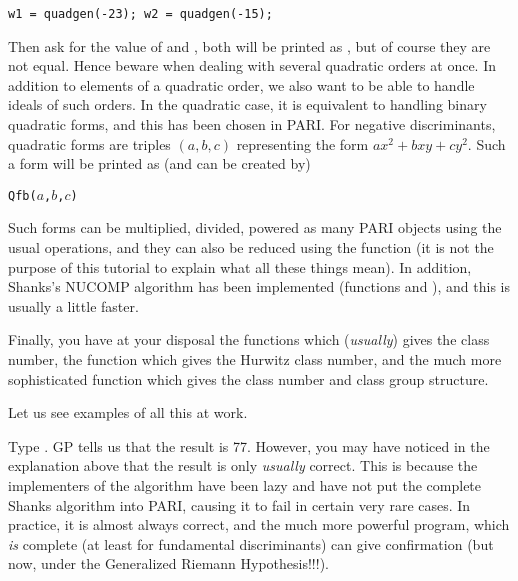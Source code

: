 \centerline{\tt w1 = quadgen(-23); w2 = quadgen(-15);}

Then ask for the value of  and , both will be printed as
, but of course they are not equal. Hence beware when dealing with
several quadratic orders at once. \smallskip
%
In addition to elements of a quadratic order, we also want to be able to
handle ideals of such orders. In the quadratic case, it is equivalent to
handling binary quadratic forms, and this has been chosen in PARI. For
negative discriminants, quadratic forms are triples $(a,b,c)$ representing
the form $ax^2+bxy+cy^2$. Such a form will be printed as (and can be created
by)

\centerline{\tt Qfb($a$,$b$,$c$)}

Such forms can be multiplied, divided, powered as many PARI objects using
the usual operations, and they can also be reduced using the function
 (it is not the purpose of this tutorial to explain what all
these things mean). In addition, Shanks's NUCOMP algorithm has been
implemented (functions  and ), and this is
usually a little faster.

Finally, you have at your disposal the functions  which
({\it usually\/}) gives the class number, the function 
which gives the Hurwitz class number, and the much more sophisticated
 function which gives the class number and class group
structure.

Let us see examples of all this at work.

Type . GP tells us that the result is 77. However,
you may have noticed in the explanation above that the result is only
{\it usually\/} correct. This is because the implementers of the algorithm
have been lazy and have not put the complete Shanks algorithm into PARI,
causing it to fail in certain very rare cases. In practice, it is almost
always correct, and the much more powerful  program, which
{\it is} complete (at least for fundamental discriminants) can give
confirmation (but now, under the Generalized Riemann Hypothesis!!!).

